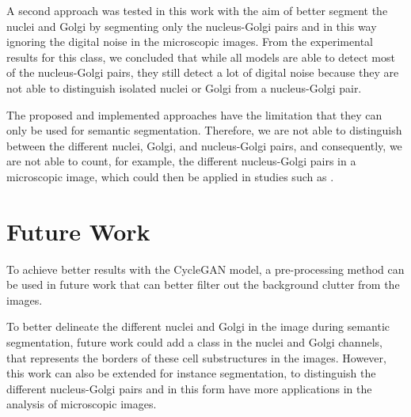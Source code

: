 A second approach was tested in this work with the aim of better segment the nuclei and Golgi by segmenting only the nucleus-Golgi pairs and in this way ignoring the digital noise in the microscopic images. From the experimental results for this class, we concluded that while all models are able to detect most of the nucleus-Golgi pairs, they still detect a lot of digital noise because they are not able to distinguish isolated nuclei or Golgi from a nucleus-Golgi pair.

The proposed and implemented approaches have the limitation that they can only be used for semantic segmentation. Therefore, we are not able to distinguish between the different nuclei, Golgi, and nucleus-Golgi pairs, and consequently, we are not able to count, for example, the different nucleus-Golgi pairs in a microscopic image, which could then be applied in studies such as \cite{nuclei&golgi}.

\section{Future Work}

To achieve better results with the CycleGAN model, a pre-processing method can be used in future work that can better filter out the background clutter from the images.

To better delineate the different nuclei and Golgi in the image during semantic segmentation, future work could add a class in the nuclei and Golgi channels, that represents the borders of these cell substructures in the images. However, this work can also be extended for instance segmentation, to distinguish the different nucleus-Golgi pairs and in this form have more applications in the analysis of microscopic images.
